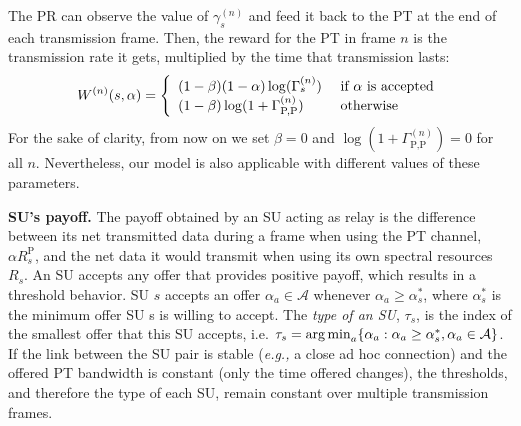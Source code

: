 The PR can observe the value of $\gamma_s^{(n)}$ and feed it back to the PT at the end of each transmission frame. Then, the reward for the PT in frame $n$ is the transmission rate it gets, multiplied by the time that transmission lasts:
\begin{equation}\label{eq:W}
W^{(n)}(s,\alpha) = \left\{ 
  \begin{array}{l l}
    (1-\beta)(1-\alpha)\log({\Gamma_s^{(n)}}) & \text{  } \text{if } \alpha \text{ is accepted}\\
    (1-\beta)\log(1+\Gamma_{\text{P,P}}^{(n)}) & \text{  } \text{otherwise}
  \end{array} \right.
\end{equation}
For the sake of clarity, from now on we set $\beta=0$ and $\log{(1+\Gamma_{\text{P,P}}^{(n)})} = 0$ for all $n$. Nevertheless, our model is also applicable with different values of these parameters. 



\textbf{SU's payoff.} The payoff obtained by an SU acting as relay is the difference between its net transmitted data during a frame when using the PT channel, $\alpha R_{s}^{\text{P}}$, and the net data it would transmit when using its own spectral resources $R_{s}$. An SU accepts any offer that provides positive payoff, which results in a threshold behavior. 
SU $s$ accepts an offer $\alpha_a \in \mathcal{A}$ whenever $\alpha_a \geq \alpha_s^*$, where $\alpha_s^*$ is the minimum offer SU s is willing to accept. The \textit{type of an SU}, $\tau_s$, is the index of the smallest offer that this SU accepts, i.e. $\tau_s = \operatorname*{arg\,min}_a\{\alpha_a: \alpha_a\geq \alpha_s^*, \alpha_a \in \mathcal{A}\}$.
If the link between the SU pair is stable (\textit{e.g.,} a close ad hoc connection) and the offered PT bandwidth is constant (only the time offered changes), the thresholds, and therefore the type of each SU, remain constant over multiple transmission frames.

